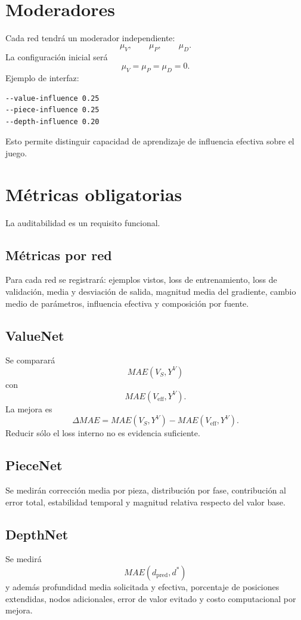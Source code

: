 \documentclass[11pt,a4paper]{article}
\begin{document}
\section{Moderadores}
Cada red tendrá un moderador independiente:
\[
\mu_V,\qquad\mu_P,\qquad\mu_D.
\]
La configuración inicial será
\[
\mu_V=\mu_P=\mu_D=0.
\]
Ejemplo de interfaz:
\begin{lstlisting}
--value-influence 0.25
--piece-influence 0.25
--depth-influence 0.20
\end{lstlisting}
Esto permite distinguir capacidad de aprendizaje de influencia efectiva sobre el juego.

\section{Métricas obligatorias}
La auditabilidad es un requisito funcional.

\subsection{Métricas por red}
Para cada red se registrará: ejemplos vistos, loss de entrenamiento, loss de validación, media y desviación de salida, magnitud media del gradiente, cambio medio de parámetros, influencia efectiva y composición por fuente.

\subsection{ValueNet}
Se comparará
\[
MAE(V_S,Y^V)
\]
con
\[
MAE(V_{\mathrm{eff}},Y^V).
\]
La mejora es
\[
\Delta MAE=MAE(V_S,Y^V)-MAE(V_{\mathrm{eff}},Y^V).
\]
Reducir sólo el loss interno no es evidencia suficiente.

\subsection{PieceNet}
Se medirán corrección media por pieza, distribución por fase, contribución al error total, estabilidad temporal y magnitud relativa respecto del valor base.

\subsection{DepthNet}
Se medirá
\[
MAE(d_{\mathrm{pred}},d^*)
\]
y además profundidad media solicitada y efectiva, porcentaje de posiciones extendidas, nodos adicionales, error de valor evitado y costo computacional por mejora.
\end{document}

